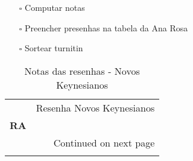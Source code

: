\documentclass[11pt]{article}
\begin{document}
\begin{itemize}
\item[{$\square$}] Computar notas
\item[{$\square$}] Preencher presenhas na tabela da Ana Rosa
\item[{$\square$}] Sortear turnitin
\end{itemize}
\begin{center}
\begin{longtable}{lr}
\caption{Notas das resenhas - Novos Keynesianos}\\
\toprule
{} &  Resenha Novos Keynesianos \\
\textbf{RA    } &                            \\
\midrule
\endhead
\midrule
\multicolumn{2}{r}{{Continued on next page}} \\
\midrule
\endfoot


\end{longtable}
\end{center}
\end{document}
